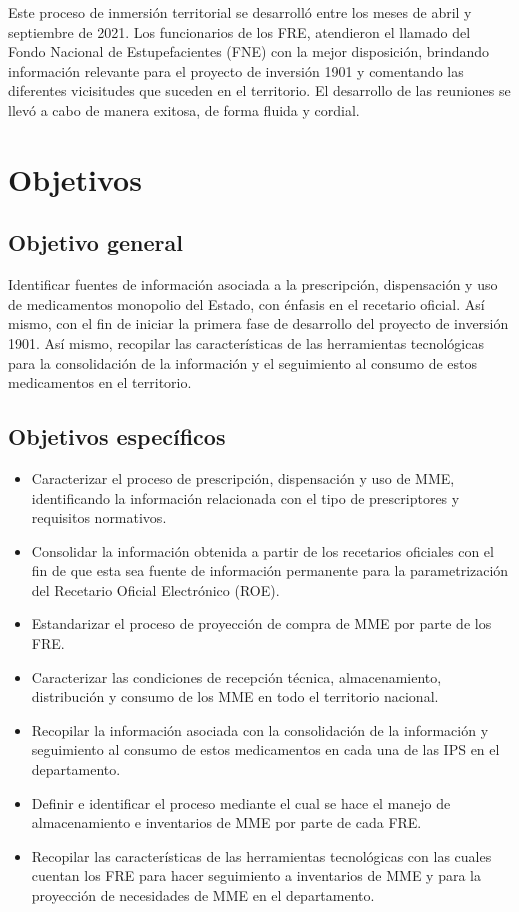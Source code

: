 \documentclass[
]{book}
\begin{document}
Este proceso de inmersión territorial se desarrolló entre los meses de abril y septiembre de 2021. Los funcionarios de los FRE, atendieron el llamado del Fondo Nacional de Estupefacientes (FNE) con la mejor disposición, brindando información relevante para el proyecto de inversión 1901 y comentando las diferentes vicisitudes que suceden en el territorio. El desarrollo de las reuniones se llevó a cabo de manera exitosa, de forma fluida y cordial.

\hypertarget{objetivos}{%
\chapter{Objetivos}\label{objetivos}}

\hypertarget{objetivo-general}{%
\section{Objetivo general}\label{objetivo-general}}

Identificar fuentes de información asociada a la prescripción, dispensación y uso de medicamentos monopolio del Estado, con énfasis en el recetario oficial. Así mismo, con el fin de iniciar la primera fase de desarrollo del proyecto de inversión 1901. Así mismo, recopilar las características de las herramientas tecnológicas para la consolidación de la información y el seguimiento al consumo de estos medicamentos en el territorio.

\hypertarget{objetivos-especuxedficos}{%
\section{Objetivos específicos}\label{objetivos-especuxedficos}}

\begin{itemize}
\item
  Caracterizar el proceso de prescripción, dispensación y uso de MME, identificando la información relacionada con el tipo de prescriptores y requisitos normativos.
\item
  Consolidar la información obtenida a partir de los recetarios oficiales con el fin de que esta sea fuente de información permanente para la parametrización del Recetario Oficial Electrónico (ROE).
\item
  Estandarizar el proceso de proyección de compra de MME por parte de los FRE.
\item
  Caracterizar las condiciones de recepción técnica, almacenamiento, distribución y consumo de los MME en todo el territorio nacional.
\item
  Recopilar la información asociada con la consolidación de la información y seguimiento al consumo de estos medicamentos en cada una de las IPS en el departamento.
\item
  Definir e identificar el proceso mediante el cual se hace el manejo de almacenamiento e inventarios de MME por parte de cada FRE.
\item
  Recopilar las características de las herramientas tecnológicas con las cuales cuentan los FRE para hacer seguimiento a inventarios de MME y para la proyección de necesidades de MME en el departamento.
\end{itemize}
\end{document}
